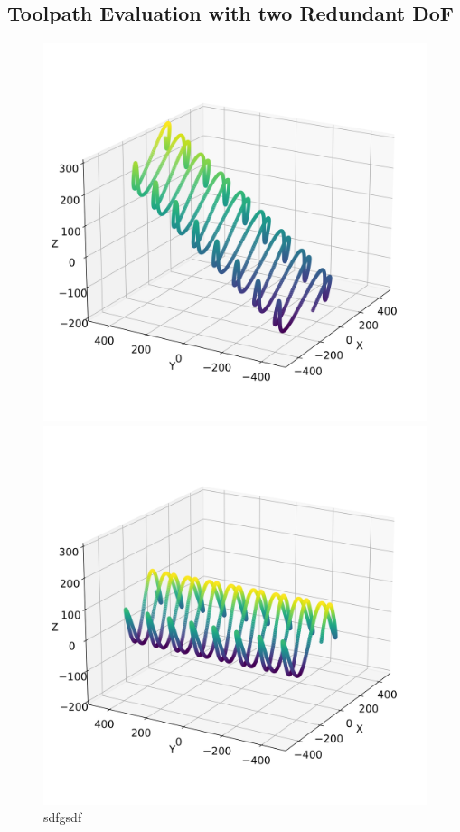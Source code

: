 \subsection{Toolpath Evaluation with two Redundant DoF}
\begin{figure}[H]%
	\centering
	\begin{minipage}{0.5\textwidth}
		\includegraphics[width=\textwidth]{figures/path3_kipp_25.png}
		\caption{sdfgsdf}
		\label{asdsdfg}
	\end{minipage}\hfill
	\begin{minipage}{0.5\textwidth}
		\includegraphics[width=\textwidth]{figures/path3_kipp_0.png}

\end{minipage}
\end{figure}
